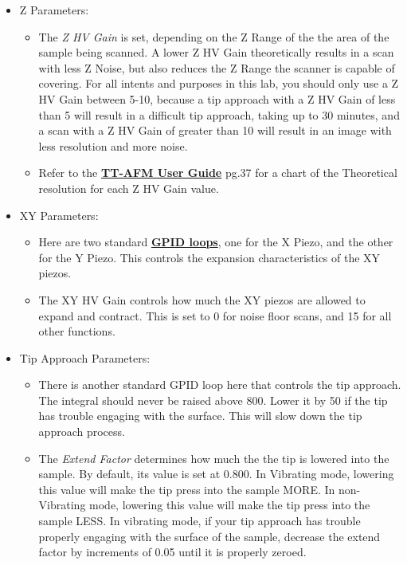 \documentclass{../lab}
\begin{document}
\begin{itemize}
    \item Z Parameters:

    \begin{itemize}
        \item The \emph{Z HV Gain} is set, depending on the Z Range of the the area of the sample being scanned.  A lower Z HV Gain theoretically results in a scan with less Z Noise, but also reduces the Z Range the scanner is capable of covering.  For all intents and purposes in this lab, you should only use a Z HV Gain between 5-10, because a tip approach with a Z HV Gain of less than 5 will result in a difficult tip approach, taking up to 30 minutes, and a scan with a Z HV Gain of greater than 10 will result in an image with less resolution and more noise.

        \item Refer to the \href{http://experimentationlab.berkeley.edu/tt-afmuserguidev2.2}{\textbf{TT-AFM User Guide}} pg.37 for a chart of the Theoretical resolution for each Z HV Gain value.

    \end{itemize}

    \item XY Parameters:

    \begin{itemize}
        \item Here are two standard \href{https://en.wikipedia.org/wiki/PID\_controller}{\textbf{GPID loops}}, one for the X Piezo, and the other for the Y Piezo.  This controls the expansion characteristics of the XY piezos.

        \item The XY HV Gain controls how much the XY piezos are allowed to expand and contract.  This is set to 0 for noise floor scans, and 15 for all other functions.

    \end{itemize}

    \item Tip Approach Parameters:

    \begin{itemize}
        \item There is another standard GPID loop here that controls the tip approach.  The integral should never be raised above 800. Lower it by 50 if the tip has trouble engaging with the surface.  This will slow down the tip approach process.

        \item The \emph{Extend Factor} determines how much the the tip is lowered into the sample.  By default, its value is set at 0.800. In Vibrating mode, lowering this value will make the tip press into the sample MORE.  In non-Vibrating mode, lowering this value will make the tip press into the sample LESS.  In vibrating mode, if your tip approach has trouble properly engaging with the surface of the sample, decrease the extend factor by increments of 0.05 until it is properly zeroed.


\end{itemize}
\end{itemize}
\end{document}
